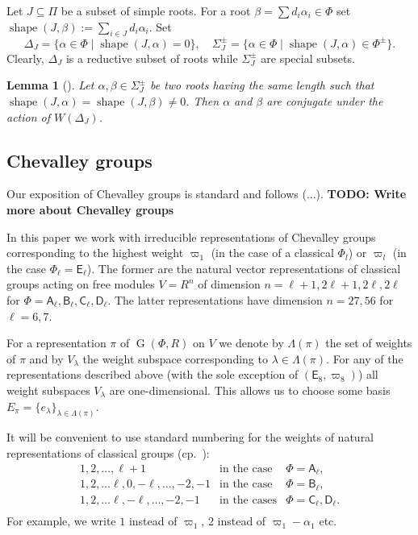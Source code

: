 \documentclass[12pt]{amsart}
\numberwithin{equation}{section}
\newtheorem{lemma}[lemmacounter]{Lemma}
\theoremstyle{definition}
\DeclareMathOperator{\G}{G}
\DeclareMathOperator{\shape}{shape}
\newcommand{\rA}{\mathsf{A}}
\newcommand{\rB}{\mathsf{B}}
\newcommand{\rC}{\mathsf{C}}
\newcommand{\rD}{\mathsf{D}}
\newcommand{\rE}{\mathsf{E}}
\begin{document}
Let $J\subseteq \Pi$ be a subset of simple roots. 
For a root $\beta = \sum d_i\alpha_i \in \Phi$ set $\shape(J, \beta):=\sum\limits_{i\in J}d_i \alpha_i$.
Set $$\Delta_J = \{\alpha \in \Phi \mid \shape(J, \alpha)=0\},\quad \Sigma^\pm_J = \{\alpha \in \Phi \mid \shape(J, \alpha)\in\Phi^\pm \}.$$
Clearly, $\Delta_J$ is a reductive subset of roots while $\Sigma^\pm_J$ are special subsets.

\begin{lemma}[{\cite[Lemma~1]{ABS}}]\label{lemma:abs}
Let $\alpha, \beta \in \Sigma^\pm_J$ be two roots having the same length such that $\shape(J,\alpha)=\shape(J,\beta)\neq 0$.
Then $\alpha$ and $\beta$ are conjugate under the action of $W(\Delta_J)$.
\end{lemma}

\subsection{Chevalley groups}
Our exposition of Chevalley groups is standard and follows (...).
\textbf{TODO: Write more about Chevalley groups}

In this paper we work with irreducible representations of Chevalley groups corresponding to the highest weight
$\varpi_1$ (in the case of a classical $\Phi_l$) or $\varpi_l$ (in the case $\Phi_\ell=\rE_\ell$). 
The former are the natural vector representations of classical groups acting on free modules $V=R^n$ of dimension 
$n=\ell+1, 2\ell+1, 2\ell,2\ell$ for $\Phi=\rA_\ell,\rB_\ell,\rC_\ell,\rD_\ell$.
The latter representations have dimension $n=27, 56$ for $\ell=6,7$.

For a representation $\pi$ of $\G(\Phi, R)$ on $V$ we denote by $\Lambda(\pi)$ the set of weights of $\pi$ and by $V_\lambda$ the weight subspace corresponding to $\lambda\in\Lambda(\pi)$.
For any of the representations described above (with the sole exception of $(\rE_8, \varpi_8)$) all weight subspaces $V_\lambda$ are one-dimensional. 
This allows us to choose some basis $E_\pi=\{e_\lambda\}_{\lambda\in\Lambda(\pi)}$.

It will be convenient to use standard numbering for the weights of natural representations of classical groups (cp.~\cite[§1B]{St78}):
$$\begin{array}{cll}
  1,2,\ldots, \ell+1 & \text{in the case} & \Phi =\rA_\ell, \\
  1,2,\ldots \ell, 0, -\ell,\ldots, -2, -1 & \text{in the case} & \Phi =\rB_\ell, \\
  1,2,\ldots \ell, -\ell,\ldots, -2, -1 & \text{in the cases}   & \Phi =\rC_\ell, \rD_\ell. \\
\end{array}$$
For example, we write $1$ instead of $\varpi_1$, $2$ instead of $\varpi_1-\alpha_1$ etc.
\end{document}
